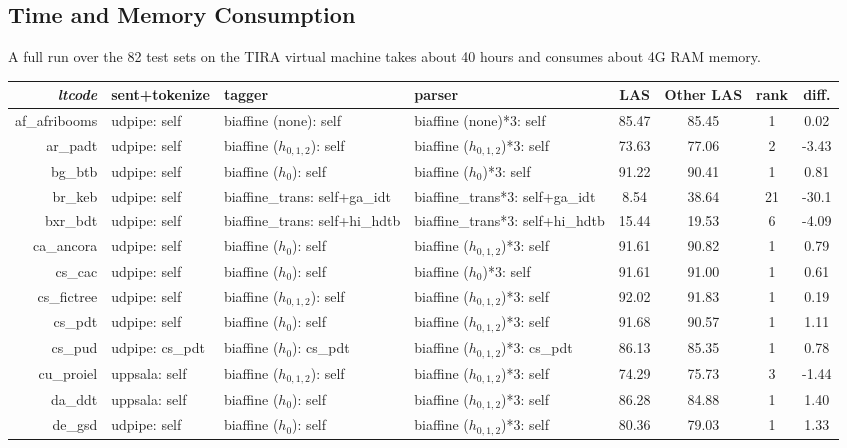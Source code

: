\documentclass[11pt,a4paper]{article}
\begin{document}
\subsection{Time and Memory Consumption}
A full run over the 82 test sets on the TIRA virtual machine \cite{tira}
takes about 40 hours and consumes about 4G RAM memory.
\begin{table}[t]
\scriptsize
\centering
\setlength{\tabcolsep}{4pt}
\begin{tabular}{rlllcccc}
\textit{ltcode} & sent+tokenize & tagger & parser & LAS & Other LAS & rank & diff. \\
\hline
af\_afribooms & udpipe: self & biaffine (none): self & biaffine (none)*3: self & 85.47 & 85.45 & 1 & 0.02 \\
ar\_padt & udpipe: self & biaffine ($h_{0,1,2}$): self & biaffine ($h_{0,1,2}$)*3: self & 73.63 & 77.06 & 2 & -3.43 \\
bg\_btb & udpipe: self & biaffine ($h_{0}$): self & biaffine ($h_{0}$)*3: self & 91.22 & 90.41 & 1 & 0.81 \\
br\_keb & udpipe: self & biaffine\_trans: self+ga\_idt & biaffine\_trans*3: self+ga\_idt & 8.54 & 38.64 & 21 & -30.1 \\
bxr\_bdt & udpipe: self & biaffine\_trans: self+hi\_hdtb & biaffine\_trans*3: self+hi\_hdtb & 15.44 & 19.53 & 6 & -4.09 \\
ca\_ancora & udpipe: self & biaffine ($h_{0}$): self & biaffine ($h_{0,1,2}$)*3: self & 91.61 & 90.82 & 1 & 0.79 \\
cs\_cac & udpipe: self & biaffine ($h_{0}$): self & biaffine ($h_{0}$)*3: self & 91.61 & 91.00 & 1 & 0.61 \\
cs\_fictree & udpipe: self & biaffine ($h_{0,1,2}$): self & biaffine ($h_{0,1,2}$)*3: self & 92.02 & 91.83 & 1 & 0.19 \\
cs\_pdt & udpipe: self & biaffine ($h_{0}$): self & biaffine ($h_{0,1,2}$)*3: self & 91.68 & 90.57 & 1 & 1.11 \\
cs\_pud & udpipe: cs\_pdt & biaffine ($h_{0}$): cs\_pdt & biaffine ($h_{0,1,2}$)*3: cs\_pdt & 86.13 & 85.35 & 1 & 0.78 \\
cu\_proiel & uppsala: self & biaffine ($h_{0,1,2}$): self & biaffine ($h_{0,1,2}$)*3: self & 74.29 & 75.73 & 3 & -1.44 \\
da\_ddt & uppsala: self & biaffine ($h_{0}$): self & biaffine ($h_{0,1,2}$)*3: self & 86.28 & 84.88 & 1 & 1.40 \\
de\_gsd & udpipe: self & biaffine ($h_{0}$): self & biaffine ($h_{0,1,2}$)*3: self & 80.36 & 79.03 & 1 & 1.33 \\

\end{tabular}
\end{table}
\end{document}
